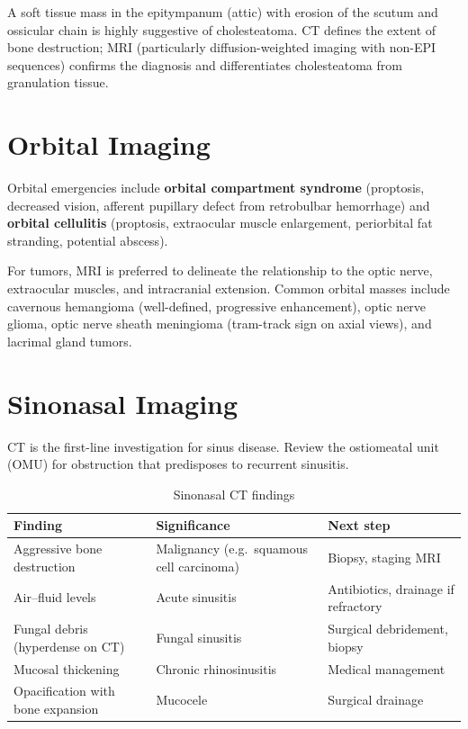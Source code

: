 \begin{pearlbox}
A soft tissue mass in the epitympanum (attic) with erosion of the scutum and ossicular chain is highly suggestive of cholesteatoma. CT defines the extent of bone destruction; MRI (particularly diffusion-weighted imaging with non-EPI sequences) confirms the diagnosis and differentiates cholesteatoma from granulation tissue.
\end{pearlbox}


\section{Orbital Imaging}
Orbital emergencies include \textbf{orbital compartment syndrome} (proptosis, decreased vision, afferent pupillary defect from retrobulbar hemorrhage) and \textbf{orbital cellulitis} (proptosis, extraocular muscle enlargement, periorbital fat stranding, potential abscess).

For tumors, MRI is preferred to delineate the relationship to the optic nerve, extraocular muscles, and intracranial extension. Common orbital masses include cavernous hemangioma (well-defined, progressive enhancement), optic nerve glioma, optic nerve sheath meningioma (tram-track sign on axial views), and lacrimal gland tumors.


\section{Sinonasal Imaging}
CT is the first-line investigation for sinus disease. Review the ostiomeatal unit (OMU) for obstruction that predisposes to recurrent sinusitis.

\begin{table}[h]
\centering
\caption{Sinonasal CT findings}
\begin{tabular}{p{4cm} p{4.5cm} p{4.5cm}}
\hline
\textbf{Finding} & \textbf{Significance} & \textbf{Next step} \\
\hline
Aggressive bone destruction & Malignancy (e.g.\ squamous cell carcinoma) & Biopsy, staging MRI \\
Air--fluid levels & Acute sinusitis & Antibiotics, drainage if refractory \\
Fungal debris (hyperdense on CT) & Fungal sinusitis & Surgical debridement, biopsy \\
Mucosal thickening & Chronic rhinosinusitis & Medical management \\
Opacification with bone expansion & Mucocele & Surgical drainage \\
\hline
\end{tabular}
\end{table}


